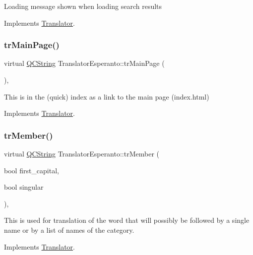 Loading message shown when loading search results 

Implements \mbox{\hyperlink{class_translator}{Translator}}.

\mbox{\label{class_translator_esperanto_ae9336dcf682a4cc86705d8b21115d065}} 
\subsubsection{\texorpdfstring{trMainPage()}{trMainPage()}}
{\footnotesize\ttfamily virtual \mbox{\hyperlink{class_q_c_string}{Q\+C\+String}} Translator\+Esperanto\+::tr\+Main\+Page (\begin{DoxyParamCaption}{ }\end{DoxyParamCaption})\hspace{0.3cm}{\ttfamily [inline]}, {\ttfamily [virtual]}}

This is in the (quick) index as a link to the main page (index.\+html) 

Implements \mbox{\hyperlink{class_translator}{Translator}}.

\mbox{\label{class_translator_esperanto_a50dde730d8596825c32099a7044fc19c}} 
\subsubsection{\texorpdfstring{trMember()}{trMember()}}
{\footnotesize\ttfamily virtual \mbox{\hyperlink{class_q_c_string}{Q\+C\+String}} Translator\+Esperanto\+::tr\+Member (\begin{DoxyParamCaption}\item[{bool}]{first\+\_\+capital,  }\item[{bool}]{singular }\end{DoxyParamCaption})\hspace{0.3cm}{\ttfamily [inline]}, {\ttfamily [virtual]}}

This is used for translation of the word that will possibly be followed by a single name or by a list of names of the category. 

Implements \mbox{\hyperlink{class_translator}{Translator}}.

